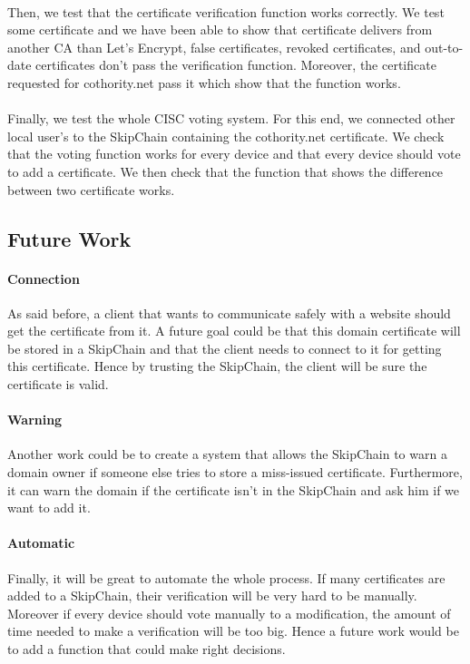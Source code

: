 \documentclass[11pt, a4paper, twoside, openright]{article}
\begin{document}
\paragraph{} Then, we test that the certificate verification function works correctly. We test some certificate and we have been able to show that certificate delivers from another CA than Let's Encrypt, false certificates, revoked certificates, and out-to-date certificates don't pass the verification function. Moreover, the certificate requested for cothority.net pass it which show that the function works. 
\paragraph{} Finally, we test the whole CISC voting system. For this end, we connected other local user's to the SkipChain containing the cothority.net certificate.  We check that the voting function works for every device and that every device should vote to add a certificate. We then check that the function that shows the difference between two certificate works. 
\subsection{Future Work}
\paragraph{Connection}
As said before, a client that wants to communicate safely with a website should get the certificate from it. A future goal could be that this domain certificate will be stored in a SkipChain and that the client needs to connect to it for getting this certificate. Hence by trusting the SkipChain, the client will be sure the certificate is valid. 
\paragraph{Warning}
Another work could be to create a system that allows the SkipChain to warn a domain owner if someone else tries to store a miss-issued certificate. Furthermore, it can warn the domain if the certificate isn't in the SkipChain and ask him if we want to add it. 
\paragraph{Automatic}    
Finally, it will be great to automate the whole process. If many certificates are added to a SkipChain, their verification will be very hard to be manually. Moreover if every device should vote manually to a modification, the amount of time needed to make a verification will be too big. Hence a future work would be to add a function that could make right decisions.         
\end{document}
